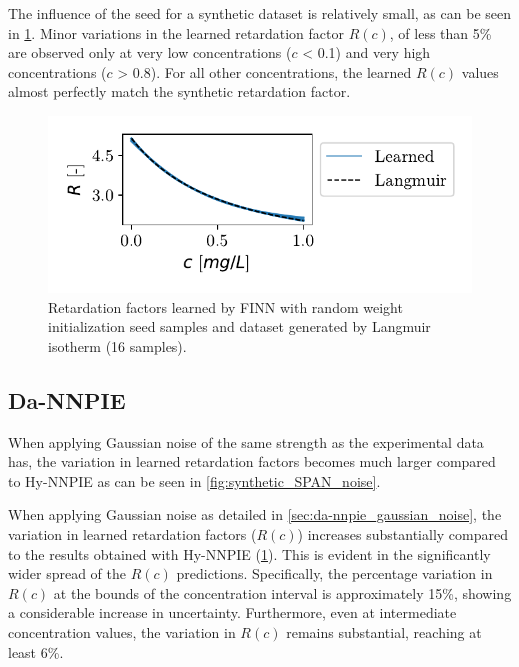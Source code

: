 The influence of the seed for a synthetic dataset is relatively small, as can be seen in \cref{fig:synthetic_SPAN_seed}. Minor variations in the learned retardation factor $R(c)$, of less than 5\% are observed only at very low concentrations ($c$ < 0.1) and very high concentrations ($c$ > 0.8). For all other concentrations, the learned $R(c)$ values almost perfectly match the synthetic retardation factor.


\begin{figure}[h]
    \centering
    \includegraphics{figs/finn_synthetic_SPAN_seed.pdf}
    \caption{Retardation factors learned by FINN with random weight initialization seed samples and dataset generated by Langmuir isotherm (16 samples).}
    \label{fig:synthetic_SPAN_seed}
\end{figure}



\subsection{Da-NNPIE}
When applying Gaussian noise of the same strength as the experimental data has, the variation in learned retardation factors becomes much larger compared to Hy-NNPIE as can be seen in \cref{fig:synthetic_SPAN_noise}.

When applying Gaussian noise as detailed in \cref{sec:da-nnpie_gaussian_noise}, the variation in learned retardation factors ($R(c)$) increases substantially compared to the results obtained with Hy-NNPIE (\cref{fig:synthetic_SPAN_seed}). This is evident in the significantly wider spread of the $R(c)$ predictions. Specifically, the percentage variation in $R(c)$ at the bounds of the concentration interval is approximately 15\%, showing a considerable increase in uncertainty. Furthermore, even at intermediate concentration values, the variation in $R(c)$ remains substantial, reaching at least 6\%.

